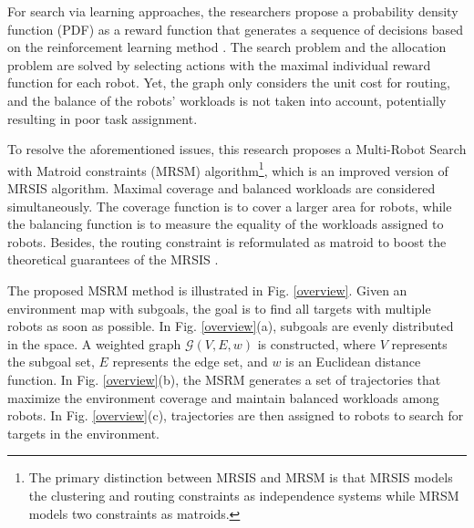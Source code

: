 

For search via learning approaches,
the researchers propose a probability density function (PDF) as a reward function that generates a sequence of decisions based on the reinforcement learning method \cite{sheng2022pd}.
The search problem and the allocation problem are solved by selecting actions with the maximal individual reward function for each robot.
Yet, the graph only considers the unit cost for routing, and the balance of the robots' workloads is not taken into account, potentially resulting in poor task assignment.

To resolve the aforementioned issues, this research proposes a Multi-Robot Search with Matroid constraints (MRSM) algorithm\footnote{The primary distinction between MRSIS and MRSM is that MRSIS models the clustering and routing constraints as independence systems while MRSM models two constraints as matroids.}, which is an improved version of MRSIS algorithm\cite{li2024mrsis}.
Maximal coverage and balanced workloads are considered simultaneously.
The coverage function is to cover a larger area for robots, while the balancing function is to measure the equality of the workloads assigned to robots.
Besides, the routing constraint is reformulated as matroid to boost the theoretical guarantees of the MRSIS \cite{li2024mrsis}.

The proposed MSRM method is illustrated in Fig. \ref{overview}. Given an environment map with subgoals, the goal is to find all targets with multiple robots as soon as possible.
In Fig. \ref{overview}(a), subgoals are evenly distributed in the space. A weighted graph $\mathcal{G}(V,E, w)$ is constructed, where $V$ represents the subgoal set, $E$ represents the edge set, and $w$ is an Euclidean distance function.
In Fig. \ref{overview}(b), the MSRM generates a set of trajectories that maximize the environment coverage and maintain balanced workloads among robots.
In Fig. \ref{overview}(c), trajectories are then assigned to robots to search for targets in the environment.

